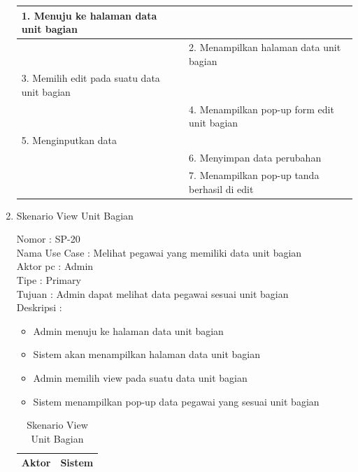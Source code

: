 \begin{enumerate}
\begin{table}
\begin{tabular}{ | p{55mm} | p{73mm} |}
		1.	Menuju ke halaman data unit bagian &  \\
		
		\hline
		
		&  2. Menampilkan halaman data unit bagian \\
		
		\hline
		
		3. Memilih edit pada suatu data unit bagian & \\
		
		\hline
		
		& 4.	Menampilkan pop-up form edit unit bagian \\
		
		\hline
		
		5.	Menginputkan data  & \\
		\hline
		
		& 6.	Menyimpan data perubahan \\
		\hline
		
		& 7.	Menampilkan pop-up tanda berhasil di edit \\
		\hline
		
	\end{tabular}
\end{table}

\item Skenario View Unit Bagian

Nomor \kern 3.6pc : SP-20 \\
Nama Use Case : Melihat pegawai yang memiliki data unit bagian \\
Aktor  pc : Admin \\
Tipe \kern 4.6pc : Primary \\
Tujuan \kern 3.6pc : Admin dapat melihat data pegawai sesuai unit bagian \\
Deskripsi \kern 2.5pc : 

\begin{itemize}
	\item Admin menuju ke halaman data unit bagian
	\item Sistem akan menampilkan halaman data unit bagian
	\item Admin memilih view pada suatu data unit bagian
	\item Sistem menampilkan pop-up data pegawai yang sesuai unit bagian
	
\end{itemize}

\begin{table}
	\caption{Skenario View Unit Bagian}
	\centering
	\begin{tabular}{ | p{58mm} | p{70mm} |}
		\hline 
		\textbf{Aktor} & \textbf{Sistem} \\
		\hline
		

\end{tabular}
\end{table}
\end{enumerate}
